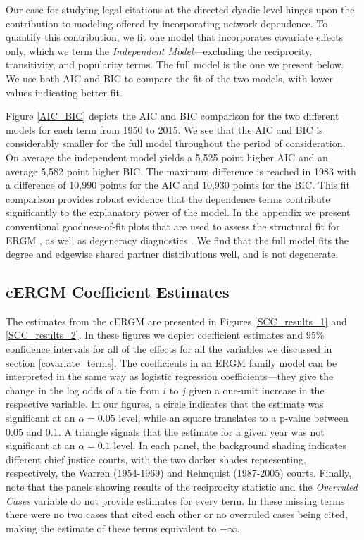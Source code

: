 \documentclass{cup-pan}
\begin{document}
Our case for studying legal citations at the directed dyadic level hinges upon the contribution to modeling offered by incorporating network dependence. To quantify this contribution, we fit one model that incorporates covariate effects only, which we term the {\em Independent Model}---excluding the reciprocity, transitivity, and popularity terms. The full model is the one we present below. We use both AIC and BIC to compare the fit of the two models, with lower values indicating better fit.  


Figure \ref{AIC_BIC} depicts the AIC and BIC comparison for the two different models for each term from 1950 to 2015. We see that the AIC and BIC is considerably smaller for the full model throughout the period of consideration. On average the independent model yields a 5,525 point higher AIC and an average 5,582 point higher BIC. The maximum difference is reached in 1983 with a difference of 10,990 points for the AIC and 10,930 points for the BIC. This fit comparison provides robust evidence that the dependence terms contribute significantly to the explanatory power of the model. In the appendix we present conventional goodness-of-fit plots that are used to assess the structural fit for ERGM \citep{hunter2008goodness}, as well as degeneracy diagnostics \citep{mukherjee2020degeneracy}. We find that the full model fits the degree and edgewise shared partner distributions well, and is not degenerate.
  
\subsection{cERGM Coefficient Estimates}
The estimates from the cERGM are presented in Figures \ref{SCC_results_1} and \ref{SCC_results_2}. In these figures we depict coefficient estimates and 95\% confidence intervals for all of the effects for all the variables we discussed in section \ref{covariate_terms}. The coefficients in an ERGM family model can be interpreted in the same way as logistic regression coefficients---they give the change in the log odds of a tie from $i$ to $j$ given a one-unit increase in the respective variable. In our figures, a circle indicates that the estimate was significant at an $\alpha=0.05$ level, while an square translates to a p-value between $0.05$ and $0.1$. A triangle signals that the estimate for a given year was not significant at an $\alpha=0.1$ level. In each panel, the background shading indicates different chief justice courts, with the two darker shades representing, respectively, the Warren (1954-1969) and Rehnquist (1987-2005) courts. Finally, note that the panels showing results of the reciprocity statistic and the \textit{Overruled Cases} variable do not provide estimates for every term. In these missing terms there were no two cases that cited each other or no overruled cases being cited, making the estimate of these terms equivalent to $-\infty$. %
\end{document}
